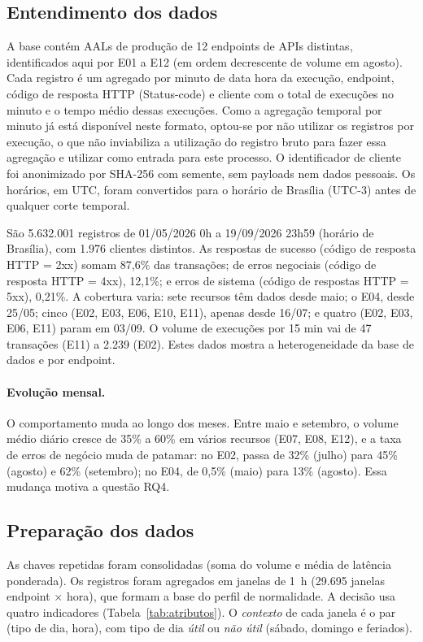 \documentclass[sigconf,nonacm]{acmart}
\begin{document}
\subsection{Entendimento dos dados}
A base contém AALs de produção de 12 endpoints de APIs distintas, identificados aqui por E01 a E12 (em ordem decrescente de volume em agosto). Cada registro é um agregado por minuto de data hora da execução, endpoint, código de resposta HTTP (Status-code) e cliente com o total de execuções no minuto e o tempo médio dessas execuções. Como a agregação temporal por minuto já está disponível neste formato, optou-se por não utilizar os registros por execução, o que não inviabiliza a utilização do registro bruto para fazer essa agregação e utilizar como entrada para este processo. O identificador de cliente foi anonimizado por SHA-256 com semente, sem payloads nem dados pessoais. Os horários, em UTC, foram convertidos para o horário de Brasília (UTC-3) antes de qualquer corte temporal.

São 5.632.001 registros de 01/05/2026 0h a 19/09/2026 23h59 (horário de Brasília), com 1.976 clientes distintos. As respostas de sucesso (código de resposta HTTP = 2xx) somam 87,6\% das transações; de erros negociais (código de resposta HTTP = 4xx), 12,1\%; e erros de sistema (código de respostas HTTP = 5xx), 0,21\%. A cobertura varia: sete recursos têm dados desde maio; o E04, desde 25/05; cinco (E02, E03, E06, E10, E11), apenas desde 16/07; e quatro (E02, E03, E06, E11) param em 03/09. O volume de execuções por 15 min vai de 47 transações (E11) a 2.239 (E02). Estes dados mostra a heterogeneidade da base de dados e por endpoint. 

\paragraph{Evolução mensal.} O comportamento muda ao longo dos meses. Entre maio e setembro, o volume médio diário cresce de 35\% a 60\% em vários recursos (E07, E08, E12), e a taxa de erros de negócio muda de patamar: no E02, passa de 32\% (julho) para 45\% (agosto) e 62\% (setembro); no E04, de 0,5\% (maio) para 13\% (agosto). Essa mudança motiva a questão RQ4.

\subsection{Preparação dos dados}
As chaves repetidas foram consolidadas (soma do volume e média de latência ponderada). Os registros foram agregados em janelas de 1~h (29.695 janelas endpoint $\times$ hora), que formam a base do perfil de normalidade. A decisão usa quatro indicadores (Tabela~\ref{tab:atributos}). O \emph{contexto} de cada janela é o par (tipo de dia, hora), com tipo de dia \emph{útil} ou \emph{não útil} (sábado, domingo e feriados).
\end{document}

